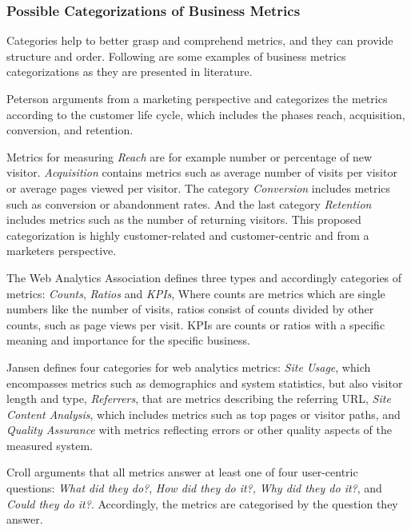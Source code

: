 \subsubsection{Possible Categorizations of Business Metrics}


Categories help to better grasp and comprehend metrics, and they can provide structure and order.
Following are some examples of business metrics categorizations as they are presented in literature.

Peterson arguments from a marketing perspective and categorizes the metrics according to the customer life cycle, which includes the phases reach, acquisition, conversion, and retention. %

Metrics for measuring \textit{Reach} are for example number or percentage of new visitor.
\textit{Acquisition} contains metrics such as average number of visits per visitor or average pages viewed per visitor.
The category \textit{Conversion} includes metrics such as conversion or abandonment rates.
And the last category \textit{Retention} includes metrics such as the number of returning visitors.
This proposed categorization is highly customer-related and customer-centric and from a marketers perspective. 

  
The Web Analytics Association defines three types and accordingly categories of metrics: \textit{Counts}, \textit{Ratios} and \textit{KPIs},%
Where counts are metrics which are single numbers like the number of visits, ratios consist of counts divided by other counts, such as page views per visit.
KPIs are counts or ratios with a specific meaning and importance for the specific business.

Jansen defines four categories for web analytics metrics: %
\textit{Site Usage}, which encompasses metrics such as demographics and system statistics, but also visitor length and type,
\textit{Referrers}, that are metrics describing the referring URL,
\textit{Site Content Analysis}, which includes metrics such as top pages or visitor paths, and
\textit{Quality Assurance} with metrics reflecting errors or other quality aspects of the measured system.

	 
Croll arguments that all metrics answer at least one of four user-centric questions: \textit{What did they do?}, \textit{How did they do it?,} \textit{Why did they do it?}, and \textit{Could they do it?}. %
Accordingly, the metrics are categorised by the question they answer.

